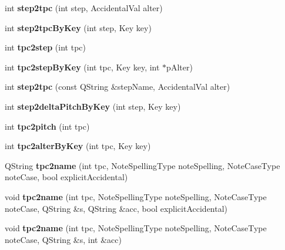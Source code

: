 \begin{DoxyCompactItemize}
int {\bfseries step2tpc} (int step, Accidental\+Val alter)
\item 
\mbox{\label{namespace_ms_a7060c1c12a48c9f7d0b9530ec68d1dbb}} 
int {\bfseries step2tpc\+By\+Key} (int step, Key key)
\item 
\mbox{\label{namespace_ms_abaad78b5a19f67c84108805bee98b551}} 
int {\bfseries tpc2step} (int tpc)
\item 
\mbox{\label{namespace_ms_aa3724a93c8a2e1efa3653df6ca9ef625}} 
int {\bfseries tpc2step\+By\+Key} (int tpc, Key key, int $\ast$p\+Alter)
\item 
\mbox{\label{namespace_ms_a29170eef9cb15fc1ed97073998a8b7ea}} 
int {\bfseries step2tpc} (const Q\+String \&step\+Name, Accidental\+Val alter)
\item 
\mbox{\label{namespace_ms_a70343aaa390132c2bf3428a50dc45893}} 
int {\bfseries step2delta\+Pitch\+By\+Key} (int step, Key key)
\item 
\mbox{\label{namespace_ms_ad5c52ee08290b242a6d87aece10724db}} 
int {\bfseries tpc2pitch} (int tpc)
\item 
\mbox{\label{namespace_ms_a17ef87f9d00fe963cf4f9013f178a643}} 
int {\bfseries tpc2alter\+By\+Key} (int tpc, Key key)
\item 
\mbox{\label{namespace_ms_a3549ee0a7a0800d8d641733803228b96}} 
Q\+String {\bfseries tpc2name} (int tpc, Note\+Spelling\+Type note\+Spelling, Note\+Case\+Type note\+Case, bool explicit\+Accidental)
\item 
\mbox{\label{namespace_ms_af35b3a0fa5bb1953cee7791531de68bd}} 
void {\bfseries tpc2name} (int tpc, Note\+Spelling\+Type note\+Spelling, Note\+Case\+Type note\+Case, Q\+String \&s, Q\+String \&acc, bool explicit\+Accidental)
\item 
\mbox{\label{namespace_ms_ab33ebf8ec7ffa8d5ea0f6813a0fbc708}} 
void {\bfseries tpc2name} (int tpc, Note\+Spelling\+Type note\+Spelling, Note\+Case\+Type note\+Case, Q\+String \&s, int \&acc)
\item 

\end{DoxyCompactItemize}

